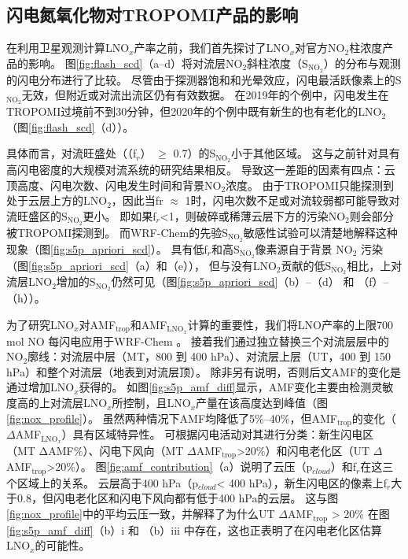 \subsection{闪电氮氧化物对TROPOMI产品的影响}  \label{subsect:lnox_affects_tropomi}


在利用卫星观测计算LNO$_x$产率之前，我们首先探讨了LNO$_x$对官方NO$_2$柱浓度产品的影响。
图\ref{fig:flash_scd}（a--d）将对流层NO$_2$斜柱浓度（S$_{\textrm{NO$_2$}}$）的分布与观测的闪电分布进行了比较。
尽管由于探测器饱和和光晕效应，闪电最活跃像素上的S$_{\textrm{NO$_2$}}$无效，但附近或对流出流区仍有有效数据。
在2019年的个例中，闪电发生在TROPOMI过境前不到30分钟，但2020年的个例中既有新生的也有老化的LNO$_2$（图\ref{fig:flash_scd}（d））。

具体而言，对流旺盛处（（f$_r$） $\geq$ 0.7）的S$_{\textrm{NO$_2$}}$小于其他区域。
这与之前针对具有高闪电密度的大规模对流系统的研究结果相反\citep{Beirle.2009}。
导致这一差距的因素有四点：云顶高度、闪电次数、闪电发生时间和背景NO$_2$浓度。
由于TROPOMI只能探测到处于云层上方的LNO$_2$，因此当fr $\approx$ 1时，闪电次数不足或对流较弱都可能导致对流旺盛区的S$_{\textrm{NO$_2$}}$更小。
即如果f$_r$<1，则破碎或稀薄云层下方的污染NO$_2$则会部分被TROPOMI探测到。
而WRF-Chem的先验S$_{\textrm{NO$_2$}}$敏感性试验可以清楚地解释这种现象（图\ref{fig:s5p_apriori_scd}）。
具有低f$_r$和高S$_{\textrm{NO$_2$}}$像素源自于背景 NO$_2$ 污染（图\ref{fig:s5p_apriori_scd}（a）和（e）），
但与没有LNO$_2$贡献的低S$_{\textrm{NO$_2$}}$相比，上对流层LNO$_2$增加的S$_{\textrm{NO$_2$}}$仍然可见（图\ref{fig:s5p_apriori_scd}（b）--（d） 和 （f）--（h））。

为了研究LNO$_x$对AMF$_\textrm{trop}$和AMF$_\textrm{LNO$_x$}$计算的重要性，我们将LNO产率的上限700 mol NO 每闪电\citep{Ott.2010}应用于WRF-Chem 。
接着我们通过独立替换三个对流层层中的NO$_2$廓线：对流层中层（MT，800 到 400 hPa）、对流层上层（UT，400 到 150 hPa）和整个对流层（地表到对流层顶）。
除非另有说明，否则后文AMF的变化是通过增加LNO$_x$获得的。
如图\ref{fig:s5p_amf_diff}显示，AMF变化主要由检测灵敏度高的上对流层LNO$_x$所控制\citep{Beirle.2009,Laughner.2017}，且LNO$_x$产量在该高度达到峰值（图\ref{fig:nox_profile}）。
虽然两种情况下AMF均降低了5\%--40\%，但AMF$_\textrm{trop}$的变化（$\Delta$AMF$_\textrm{LNO$_x$}$）具有区域特异性。
可根据闪电活动对其进行分类：新生闪电区（MT ΔAMF\%）、闪电下风向（MT $\Delta$AMF$_\textrm{trop}$>20\%）和闪电老化区（UT $\Delta$AMF$_\textrm{trop}$>20\%）。
图\ref{fig:amf_contribution}（a）说明了云压（p$_{cloud}$）和f$_r$在这三个区域上的关系。
云层高于400 hPa（p$_{cloud}$< 400 hPa），新生闪电区的像素上f$_r$大于0.8，但闪电老化区和闪电下风向都有低于400 hPa的云层。
这与图\ref{fig:nox_profile}中的平均云压一致，并解释了为什么UT $\Delta$AMF$_\textrm{trop}$ > 20\% 在图\ref{fig:s5p_amf_diff}（b）i 和 （b）iii 中存在，这也正表明了在闪电老化区估算LNO$_x$的可能性。


